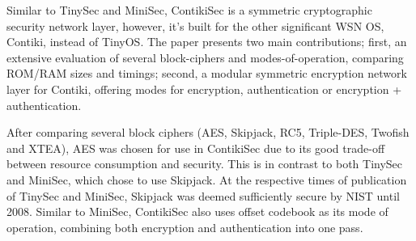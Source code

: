 Similar to TinySec\cite{TinySec} and MiniSec\cite{MiniSec}, ContikiSec \cite{ContikiSec} is a symmetric cryptographic security network layer, however, it's built for the other significant WSN OS, Contiki, instead of TinyOS. The paper presents two main contributions; first, an extensive evaluation of several block-ciphers and modes-of-operation, comparing ROM/RAM sizes and timings; second, a modular symmetric encryption network layer for Contiki, offering modes for encryption, authentication or encryption + authentication.

After comparing several block ciphers (AES, Skipjack, RC5, Triple-DES, Twofish and XTEA), AES was chosen for use in ContikiSec due to its good trade-off between resource consumption and security. This is in contrast to both TinySec and MiniSec, which chose to use Skipjack. At the respective times of publication of TinySec and MiniSec, Skipjack was deemed sufficiently secure by NIST until 2008. Similar to MiniSec, ContikiSec also uses offset codebook as its mode of operation, combining both encryption and authentication into one pass.